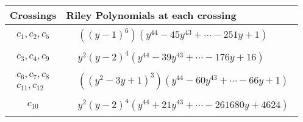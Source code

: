 \documentclass[1p]{elsarticle_modified}
\theoremstyle{definition}
\begin{document}
\begin{tabular}{m{50pt}|m{274pt}}
Crossings & \hspace{64pt}Riley Polynomials at each crossing \\
\hline $$\begin{aligned}c_{1},c_{2},c_{5}\end{aligned}$$&$\begin{aligned}
&((y-1)^6)(y^{44}-45 y^{43}+\cdots-251 y+1)
\end{aligned}$\\
\hline $$\begin{aligned}c_{3},c_{4},c_{9}\end{aligned}$$&$\begin{aligned}
&y^2(y-2)^4(y^{44}-39 y^{43}+\cdots-176 y+16)
\end{aligned}$\\
\hline $$\begin{aligned}c_{6},c_{7},c_{8}\\c_{11},c_{12}\end{aligned}$$&$\begin{aligned}
&((y^2-3 y+1)^3)(y^{44}-60 y^{43}+\cdots-66 y+1)
\end{aligned}$\\
\hline $$\begin{aligned}c_{10}\end{aligned}$$&$\begin{aligned}
&y^2(y-2)^4(y^{44}+21 y^{43}+\cdots-261680 y+4624)
\end{aligned}$\\
\hline
\end{tabular}
\vskip 2pc
\end{document}
